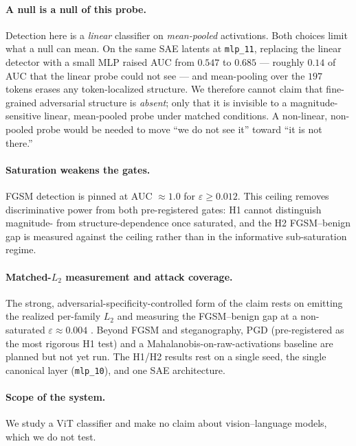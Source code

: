 \documentclass[../ppgc-tese.tex]{subfiles}
\begin{document}
\paragraph{A null is a null of this probe.} Detection here is a \emph{linear}
classifier on \emph{mean-pooled} activations. Both choices limit what a null can
mean. On the same SAE latents at \texttt{mlp\_11}, replacing the linear detector with
a small MLP raised AUC from $0.547$ to $0.685$ --- roughly $0.14$ of AUC that the
linear probe could not see --- and mean-pooling over the $197$ tokens erases any
token-localized structure. We therefore cannot claim that fine-grained adversarial
structure is \emph{absent}; only that it is invisible to a magnitude-sensitive
linear, mean-pooled probe under matched conditions. A non-linear, non-pooled probe
would be needed to move ``we do not see it'' toward ``it is not there.''

\paragraph{Saturation weakens the gates.} FGSM detection is pinned at AUC
$\approx1.0$ for $\varepsilon\geq0.012$. This ceiling removes discriminative power
from both pre-registered gates: H1 cannot distinguish magnitude- from
structure-dependence once saturated, and the H2 FGSM--benign gap is measured against
the ceiling rather than in the informative sub-saturation regime.

\paragraph{Matched-$L_2$ measurement and attack coverage.} The strong,
adversarial-specificity-controlled form of the claim rests on emitting the realized
per-family $L_2$ and measuring the FGSM--benign gap at a non-saturated
$\varepsilon\approx0.004$ . Beyond FGSM and
steganography, PGD \cite{madry2018pgd} (pre-registered as the most rigorous H1 test)
and a Mahalanobis-on-raw-activations baseline \cite{lee2018mahalanobis} are planned
but not yet run. The H1/H2 results rest on a single seed, the single canonical layer
(\texttt{mlp\_10}), and one SAE architecture.

\paragraph{Scope of the system.} We study a ViT classifier and make no claim about
vision--language models, which we do not test.
\end{document}
